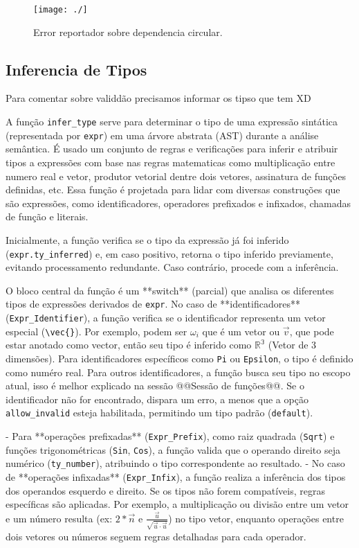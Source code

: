 \begin{figure}[H]
    \caption{\label{label} \small Error reportador sobre dependencia circular.}
    \begin{center}
        \texttt{[image: ./]}
    \end{center}
\end{figure}


\subsection{Inferencia de Tipos}
Para comentar sobre validdão precisamos informar os tipso que tem XD


A função \verb`infer_type` serve para determinar o tipo de uma expressão sintática (representada por \verb`expr`) em uma árvore abstrata (AST) durante a análise semântica. É usado um conjunto de regras e verificações para inferir e atribuir tipos a expressões com base nas regras matematicas como multiplicação entre numero real e vetor, produtor vetorial dentre dois vetores, assinatura de funções definidas, etc.  Essa função é projetada para lidar com diversas construções que são expressões, como identificadores, operadores prefixados e infixados, chamadas de função e literais.


Inicialmente, a função verifica se o tipo da expressão já foi inferido (\verb`expr.ty_inferred`) e, em caso positivo, retorna o tipo inferido previamente, evitando processamento redundante. Caso contrário, procede com a inferência.

O bloco central da função é um **switch** (parcial) que analisa os diferentes tipos de expressões derivados de \verb`expr`.  
No caso de **identificadores** (\verb`Expr_Identifier`), a função verifica se o identificador representa um vetor especial (\verb`\vec{}`). Por exemplo, podem ser $\omega_i$ que é um vetor ou $\vec{v}$, que pode estar anotado como vector, então seu tipo é inferido como $\mathbb{R^3}$ (Vetor de 3 dimensões). Para identificadores específicos como \verb`Pi` ou \verb`Epsilon`, o tipo é definido como numéro real. Para outros identificadores, a função busca seu tipo no escopo atual, isso é melhor explicado na sessão @@Sessão de funções@@. Se o identificador não for encontrado, dispara um erro, a menos que a opção \verb`allow_invalid` esteja habilitada, permitindo um tipo padrão (\verb`default`).

- Para **operações prefixadas** (\verb`Expr_Prefix`), como raiz quadrada (\verb`Sqrt`) e funções trigonométricas (\verb`Sin`, \verb`Cos`), a função valida que o operando direito seja numérico (\verb`ty_number`), atribuindo o tipo correspondente ao resultado.  
- No caso de **operações infixadas** (\verb`Expr_Infix`), a função realiza a inferência dos tipos dos operandos esquerdo e direito. Se os tipos não forem compatíveis, regras específicas são aplicadas. Por exemplo, a multiplicação ou divisão entre um vetor e um número resulta (ex: $2*\vec{n}$ e $\frac{\vec{u}}{\sqrt{\vec{u} \cdot \vec{u}}}$) no tipo vetor, enquanto operações entre dois vetores ou números seguem regras detalhadas para cada operador.  

